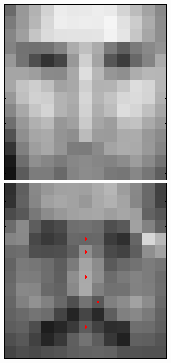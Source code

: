 \begin{figure}[ht]
 \includegraphics[width=\textwidth*11/100]{ch5/figures/XM2VTS_2_1.png}
 \includegraphics[width=\textwidth*11/100]{ch5/figures/XM2VTS_3_1.png}

\end{figure}
